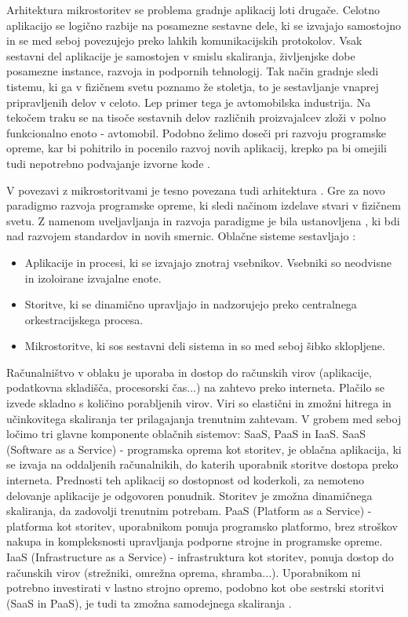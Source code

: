 \documentclass[a4paper, 12pt]{book}
\begin{document}
Arhitektura mikrostoritev se problema gradnje aplikacij loti drugače.
Celotno aplikacijo se logično razbije na posamezne sestavne dele, ki se izvajajo samostojno in se med seboj povezujejo preko lahkih komunikacijskih protokolov.
Vsak sestavni del aplikacije je samostojen v smislu skaliranja, življenjske dobe posamezne instance, razvoja in podpornih tehnologij.
Tak način gradnje sledi tistemu, ki ga v fizičnem svetu poznamo že stoletja, to je sestavljanje vnaprej pripravljenih delov v celoto.
Lep primer tega je avtomobilska industrija.
Na tekočem traku se na tisoče sestavnih delov različnih proizvajalcev zloži v polno funkcionalno enoto - avtomobil.
Podobno želimo doseči pri razvoju programske opreme, kar bi pohitrilo in pocenilo razvoj novih aplikacij, krepko pa bi omejili tudi nepotrebno podvajanje izvorne kode \cite{microservicePattern, microservicesMartin}.

V povezavi z mikrostoritvami je tesno povezana tudi arhitektura .
Gre za novo paradigmo razvoja programske opreme, ki sledi načinom izdelave stvari v fizičnem svetu.
Z namenom uveljavljanja in razvoja paradigme je bila ustanovljena , ki bdi nad razvojem standardov in novih smernic.
Oblačne sisteme sestavljajo \cite{cncf}:
\begin{itemize}
	\item Aplikacije in procesi, ki se izvajajo znotraj vsebnikov. Vsebniki so neodvisne in izoloirane izvajalne enote.
	\item Storitve, ki se dinamično upravljajo in nadzorujejo preko centralnega orkestracijskega procesa.
	\item Mikrostoritve, ki sos sestavni deli sistema in so med seboj šibko sklopljene.
\end{itemize}

Računalništvo v oblaku je uporaba in dostop do računskih virov (aplikacije, podatkovna skladišča, procesorski čas...) na zahtevo preko interneta.
Plačilo se izvede skladno s količino porabljenih virov.
Viri so elastični in zmožni hitrega in učinkovitega skaliranja ter prilagajanja trenutnim zahtevam.
V grobem med seboj ločimo tri glavne komponente oblačnih sistemov: SaaS, PaaS in IaaS.
SaaS (Software as a Service) - programska oprema kot storitev, je oblačna aplikacija, ki se izvaja na oddaljenih računalnikih, do katerih uporabnik storitve dostopa preko interneta. 
Prednosti teh aplikacij so dostopnost od koderkoli, za nemoteno delovanje aplikacije je odgovoren ponudnik.
Storitev je zmožna dinamičnega skaliranja, da zadovolji trenutnim potrebam.
PaaS (Platform as a Service) - platforma kot storitev, uporabnikom ponuja programsko platformo, brez stroškov nakupa in kompleksnosti upravljanja podporne strojne in programske opreme.
IaaS (Infrastructure as a Service) - infrastruktura kot storitev, ponuja dostop do računskih virov (strežniki, omrežna oprema, shramba...).
Uporabnikom ni potrebno investirati v lastno strojno opremo, podobno kot obe sestrski storitvi (SaaS in PaaS), je tudi ta zmožna samodejnega skaliranja \cite{ibmCloudComputing}.
\end{document}
